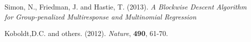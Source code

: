 \documentclass[12pt]{article}
\begin{document}
\begin{description}
\item 
Simon, N., Friedman, J. and Hastie, T. (2013).
\textit{A Blockwise Descent Algorithm for Group-penalized Multiresponse and Multinomial Regression}



\item
Koboldt,D.C. and others. (2012). \textit{Nature}, \textbf{490}, 61-70. 





\end{description}
\end{document}
